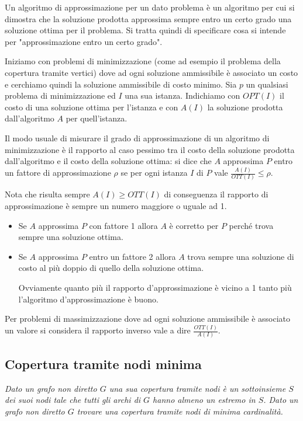 Un algoritmo di approssimazione per un dato problema è un algoritmo per cui si dimostra che la soluzione prodotta approssima sempre entro un certo grado una soluzione ottima per il problema. Si tratta quindi di specificare cosa si intende per "approssimazione entro un certo grado".

Iniziamo con problemi di minimizzazione (come ad esempio il problema della copertura tramite vertici) dove ad ogni soluzione ammissibile è associato un costo e cerchiamo quindi la soluzione ammissibile di costo minimo. Sia $p$ un qualsiasi problema di minimizzazione ed $I$ una sua istanza. Indichiamo con $OPT(I)$ il costo di una soluzione ottima per l'istanza e con $A(I)$ la soluzione prodotta dall'algoritmo $A$ per quell'istanza.

Il modo usuale di misurare il grado di approssimazione di un algoritmo di minimizzazione è il rapporto al caso pessimo tra il costo della soluzione prodotta dall'algoritmo e il costo della soluzione ottima: si dice che $A$ approssima $P$ entro un fattore di approssimazione $\rho$ se per ogni istanza $I$ di $P$ vale $\frac{A(I)}{OTT(I)}\leq\rho$.

Nota che risulta sempre $A(I) \geq OTT(I)$ di conseguenza il rapporto di approssimazione è sempre un numero maggiore o uguale ad 1.
\begin{itemize}
    \item Se $A$ approssima $P$ con fattore 1 allora $A$ è corretto per $P$ perché trova sempre una soluzione ottima.
    \item Se $A$ approssima $P$ entro un fattore 2 allora $A$ trova sempre una soluzione di costo al più doppio di quello della soluzione ottima.
    
    Ovviamente quanto più il rapporto d'approssimazione è vicino a 1 tanto più l'algoritmo d'approssimazione è buono.
\end{itemize}
Per problemi di massimizzazione dove ad ogni soluzione ammissibile è associato un valore si considera il rapporto inverso vale a dire $\frac{OTT(I)}{A(I)}$.

\subsection{Copertura tramite nodi minima}
    \textit{Dato un grafo non diretto $G$ una sua copertura tramite nodi è un sottoinsieme $S$ dei suoi nodi tale che tutti gli archi di $G$ hanno almeno un estremo in $S$. Dato un grafo non diretto $G$ trovare una copertura tramite nodi di minima cardinalità.}

